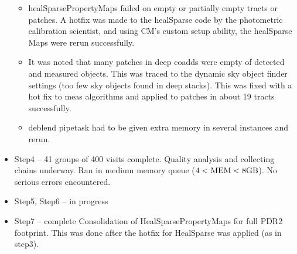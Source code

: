 \begin{itemize}
\begin{itemize}
  \item
	  healSparsePropertyMaps failed on empty or partially empty tracts
	or patches.  A hotfix was made to the healSparse code by the photometric
	calibration scientist,  and using CM's custom setup ability, 
	the healSparse Maps were rerun successfully.

 \item
	 It was noted that many patches in deep coadds were empty of detected
	and measured objects. This was traced to the dynamic sky object finder
	settings (too few sky objects found in deep stacks).  This
	was fixed with a hot fix to meas algorithms and applied to patches
	in about 19 tracts successfully.

  \item
	 deblend pipetask had to be given extra memory in several instances 
	and rerun.

\end{itemize} %

\item Step4 -- 41 groups of 400 visits complete.  Quality analysis and
		collecting chains underway.  Ran in medium memory
		queue ($\rm 4 < MEM < 8 GB$).  No serious errors
		encountered.
	
\item Step5, Step6 -- in progress

\item Step7 -- complete Consolidation of HealSparsePropertyMaps for full PDR2 footprint.  This was done after the hotfix for HealSparse was applied (as in
	step3).

\end{itemize} %

